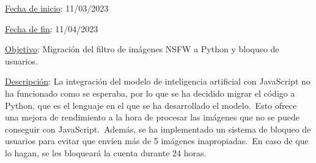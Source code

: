 
\underline{Fecha de inicio}: 11/03/2023

\underline{Fecha de fin}: 11/04/2023

\underline{Objetivo}:
Migración del filtro de imágenes NSFW a Python y bloqueo de usuarios.

\underline{Descripción}:
La integración del modelo de inteligencia artificial con JavaScript no ha funcionado como se esperaba, por lo que se
ha decidido migrar el código a Python, que es el lenguaje en el que se ha desarrollado el modelo.\ Esto ofrece
una mejora de rendimiento a la hora de procesar las imágenes que no se puede conseguir con JavaScript.\ Además, se
ha implementado un sistema de bloqueo de usuarios para evitar que envíen más de 5 imágenes inapropiadas.\ En caso de
que lo hagan, se les bloqueará la cuenta durante 24 horas.
